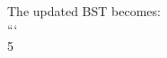 \documentclass[preview]{standalone}
\begin{document}
The updated BST becomes:\\```\\5\\
\end{document}
